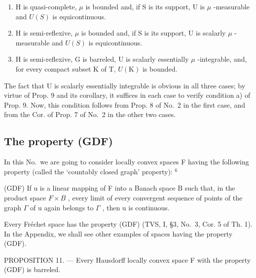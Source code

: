 \begin{enumerate}
\def\labelenumi{\alph{enumi})}
\item
  H is quasi-complete, \(\mu\) is bounded and, if S is its support, U is \(\mu\) -measurable and \(U(S)\) is equicontinuous.
\item
  H is semi-reflexive, \(\mu\) is bounded and, if S is its support, U is scalarly \(\mu\) -measurable and \(U(S)\) is equicontinuous.
\item
  H is semi-reflexive, G is barreled, U is scalarly essentially \(\mu\) -integrable, and, for every compact subset K of T, \(U(\mathrm{K})\) is bounded.
\end{enumerate}

The fact that U is scalarly essentially integrable is obvious in all three cases; by virtue of Prop. 9 and its corollary, it suffices in each case to verify condition a) of Prop. 9. Now, this condition follows from Prop. 8 of No.~2 in the first case, and from the Cor. of Prop. 7 of No.~2 in the other two cases.

\subsection{The property (GDF)}

In this No.~we are going to consider locally convex spaces F having the following property (called the `countably closed graph' property): \(^{6}\)

(GDF) If u is a linear mapping of F into a Banach space B such that, in the product space \(F \times B\) , every limit of every convergent sequence of points of the graph \(\Gamma\) of u again belongs to \(\Gamma\) , then u is continuous.

Every Fréchet space has the property (GDF) (TVS, I, §3, No.~3, Cor. 5 of Th. 1). In the Appendix, we shall see other examples of spaces having the property (GDF).

PROPOSITION 11. --- Every Hausdorff locally convex space F with the property (GDF) is barreled.

